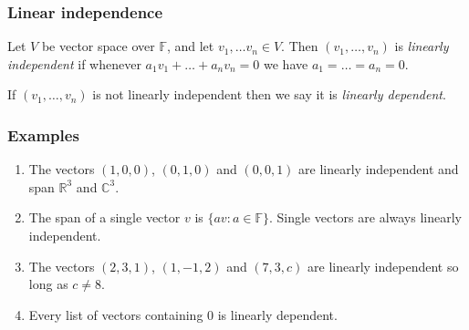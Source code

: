 \documentclass[handout]{beamer}
\newcommand{\bR}{\mathbb{R}}
\newcommand{\bC}{\mathbb{C}}
\newcommand{\bF}{\mathbb{F}}
\begin{document}
\begin{frame}
\frametitle{Linear independence}
\begin{definition}
Let $V$ be vector space over $\bF$, and let $v_1,\ldots v_n\in V$. Then $(v_1,\ldots,v_n)$ is \emph{linearly independent} if whenever $a_1v_1+\ldots + a_n v_n = 0$ we have $a_1=\ldots=a_n=0$. 

If $(v_1,\ldots,v_n)$ is not linearly independent then we say it is \emph{linearly dependent}.
\end{definition}
\end{frame}

\begin{frame}
\frametitle{Examples}
\begin{enumerate}
\item The vectors $(1,0,0)$, $(0,1,0)$ and $(0,0,1)$ are linearly independent and span $\bR^3$ and $\bC^3$.
\vspace{0.5cm}
\item The span of a single vector $v$ is $\{av:a\in \bF\}$. Single vectors are always linearly independent.
\vspace{0.5cm}
\item The vectors $(2,3,1)$, $(1,-1,2)$ and $(7,3,c)$ are linearly independent so long as $c\neq 8$.
\vspace{0.5cm}
\item Every list of vectors containing $0$ is linearly dependent.
\end{enumerate}
\end{frame}
\end{document}

